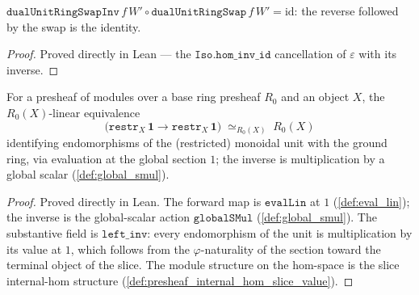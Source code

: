 \begin{lemma}\leanok
  \label{lem:dual_unit_ring_swap_inv_comp}
  \(\mathtt{dualUnitRingSwapInv}\,f\,W' \circ \mathtt{dualUnitRingSwap}\,f\,W' =
  \mathrm{id}\): the reverse followed by the swap is the identity.
\end{lemma}
\begin{proof}
  \leanok
  Proved directly in Lean --- the \(\mathtt{Iso.hom\_inv\_id}\) cancellation of
  \(\varepsilon\) with its inverse.
\end{proof}

\begin{definition}\leanok
  \label{def:unit_dual_section_equiv}
  For a presheaf of modules over a base ring presheaf \(R_0\) and an object \(X\), the
  \(R_0(X)\)-linear equivalence
  \[
    \bigl(\mathtt{restr}_X\,\mathbf 1 \to \mathtt{restr}_X\,\mathbf 1\bigr)
      \;\simeq_{R_0(X)}\; R_0(X)
  \]
  identifying endomorphisms of the (restricted) monoidal unit with the ground ring, via
  evaluation at the global section \(1\); the inverse is multiplication by a global scalar
  (\cref{def:global_smul}).
\end{definition}
\begin{proof}
  \leanok
  Proved directly in Lean. The forward map is \(\mathtt{evalLin}\) at \(1\)
  (\cref{def:eval_lin}); the inverse is the global-scalar action \(\mathtt{globalSMul}\)
  (\cref{def:global_smul}). The substantive field is \(\mathtt{left\_inv}\): every
  endomorphism of the unit is multiplication by its value at \(1\), which follows from the
  \(\varphi\)-naturality of the section toward the terminal object of the slice. The module
  structure on the hom-space is the slice internal-hom structure
  (\cref{def:presheaf_internal_hom_slice_value}).
\end{proof}

